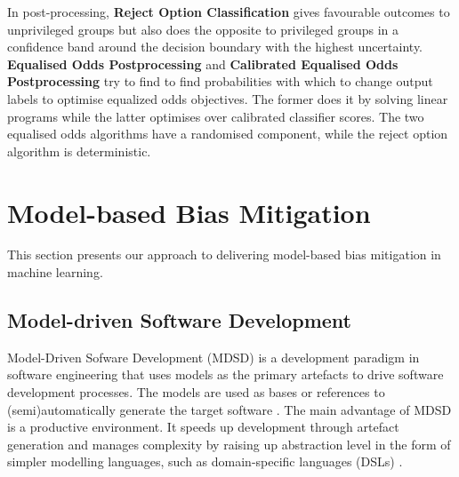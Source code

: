 \documentclass[sigconf,review]{acmart}
\begin{document}
	
	
	In post-processing, \textbf{Reject Option Classification} \cite{kamiran2012reject} gives favourable outcomes to unprivileged groups but also does the opposite to privileged groups in a confidence band around the decision boundary with the highest uncertainty.
	\textbf{Equalised Odds Postprocessing} \cite{hardt2016equal,pleiss2017equal} and \textbf{Calibrated Equalised Odds Postprocessing} \cite{pleiss2017equal} try to find to find probabilities with which to change output labels to optimise equalized odds objectives. The former does it by solving linear programs while the latter optimises over calibrated classifier scores. The two equalised odds algorithms have a randomised component, while the reject option algorithm is deterministic.
	
	\section{Model-based Bias Mitigation}
	\label{sec:model_based_bias_mitigation}
	
	This section presents our approach to delivering model-based bias mitigation in machine learning. 
	
	\subsection{Model-driven Software Development}
	\label{sec:model_based_software_development}
	Model-Driven Sofware Development (MDSD) is a development paradigm in software engineering that uses models as the primary artefacts to drive software development processes. The models are used as bases or references to (semi)automatically generate the target software \cite{brambilla2017model}. The main advantage of MDSD is a productive environment. It speeds up development through artefact generation and manages complexity by raising up abstraction level in the form of simpler modelling languages, such as domain-specific languages (DSLs) \cite{volter2013model}. 
	
\end{document}
